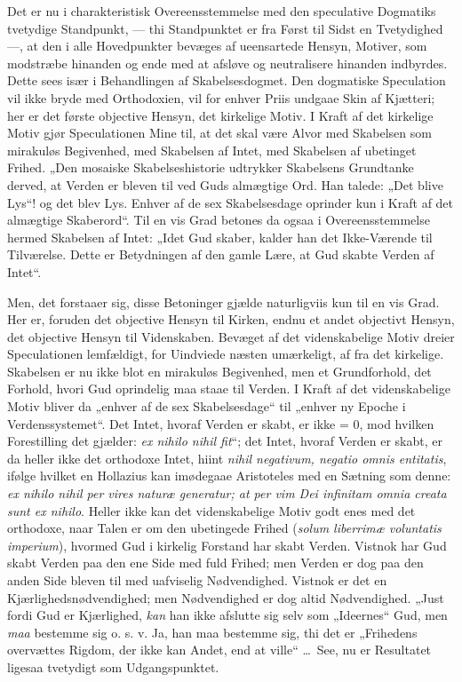 \documentclass[12pt]{book}
\newcommand{\opage}[1]{\marginnote{\footnotesize\textit{[#1]}}}
\begin{document}
Det er nu i charakteristisk Overeensstemmelse med den
speculative Dogmatiks tvetydige Standpunkt, --- thi Standpunktet
er fra Først til Sidst en Tvetydighed ---, at den i
alle Hovedpunkter bevæges af ueensartede Hensyn, Motiver,
som modstræbe hinanden og ende med at afsløve og neutralisere
hinanden indbyrdes. Dette sees især i Behandlingen af
Skabelsesdogmet. Den dogmatiske Speculation vil ikke bryde
med Orthodoxien, vil for enhver Priis undgaae Skin af
Kjætteri; her er det første objective Hensyn, det kirkelige
Motiv. I Kraft af det kirkelige Motiv gjør Speculationen
Mine til, at det skal være Alvor med Skabelsen som mirakuløs
Begivenhed, med Skabelsen af Intet, med Skabelsen af
ubetinget Frihed. „Den mosaiske Skabelseshistorie udtrykker
Skabelsens Grundtanke derved, at Verden er bleven til ved
Guds almægtige Ord. Han talede: „Det blive Lys“! og
det blev Lys. Enhver af de sex Skabelsesdage oprinder kun
i Kraft af det almægtige Skaberord“. Til en vis Grad
betones da ogsaa i Overeensstemmelse hermed Skabelsen af
Intet: „Idet Gud skaber, kalder han det Ikke-Værende til
Tilværelse. Dette er Betydningen af den gamle Lære, at
Gud skabte Verden af Intet“.

Men, det forstaaer sig, disse Betoninger gjælde naturligviis
\opage{152}kun til en vis Grad. Her er, foruden det objective
Hensyn til Kirken, endnu et andet objectivt Hensyn, det objective
Hensyn til Videnskaben. Bevæget af det videnskabelige
Motiv dreier Speculationen lemfældigt, for Uindviede næsten
umærkeligt, af fra det kirkelige. Skabelsen er nu ikke blot
en mirakuløs Begivenhed, men et Grundforhold, det Forhold,
hvori Gud oprindelig maa staae til Verden. I Kraft af det
videnskabelige Motiv bliver da „enhver af de sex Skabelsesdage“
til „enhver ny Epoche i Verdenssystemet“. Det Intet,
hvoraf Verden er skabt, er ikke = 0, mod hvilken Forestilling
det gjælder: \textit{ex nihilo nihil fit}“; %
det Intet, hvoraf Verden
er skabt, er da heller ikke det orthodoxe Intet, hiint \textit{nihil
negativum, negatio omnis entitatis}, ifølge hvilket en Hollazius
kan imødegaae Aristoteles med en Sætning som denne: \textit{ex
nihilo nihil per vires naturæ generatur; at per vim Dei
infinitam omnia creata sunt ex nihilo}. Heller ikke kan
det videnskabelige Motiv godt enes med det orthodoxe, naar
Talen er om den ubetingede Frihed (\textit{solum liberrimæ voluntatis
imperium}), hvormed Gud i kirkelig Forstand har skabt
Verden. Vistnok har Gud skabt Verden paa den ene Side
med fuld Frihed; men Verden er dog paa den anden Side
bleven til med uafviselig Nødvendighed. Vistnok er det en
Kjærlighedsnødvendighed; men Nødvendighed er dog altid
Nødvendighed. „Just fordi Gud er Kjærlighed, \emph{kan} han
ikke afslutte sig selv som „Ideernes“ Gud, men \emph{maa} bestemme
sig o. s. v. Ja, han maa bestemme sig, thi det er
„Frihedens overvættes Rigdom, der ikke kan Andet, end at
ville“ \dots\ See, nu er Resultatet ligesaa tvetydigt som Udgangspunktet.
\end{document}
